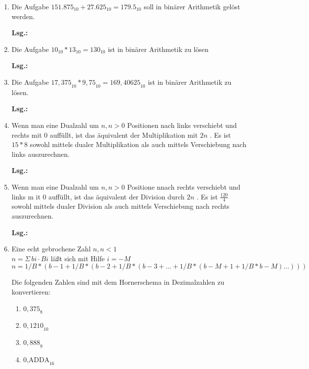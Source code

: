 \documentclass[12pt,a4paper]{scrreprt}
\newcommand{\Lsg}{\par \textbf{Lsg.: \hfill }}
\begin{document}
\begin{enumerate}
\Lsg%

\item Die Aufgabe ${151.875}_{10} + {27.625}_{10} = {179.5}_{10}$ soll in binärer Arithmetik gelöst werden.

\Lsg%

\item Die Aufgabe ${10}_{10}*{13}_{10}={130}_{10}$ ist in binärer Arithmetik zu lösen

\Lsg%

\item Die Aufgabe ${17,375}_{10}*{9,75}_{10} = {169,40625}_{10}$ ist in binärer Arithmetik zu lösen.

\Lsg%

\item Wenn man eine Dualzahl um $n, n>0$ Positionen nach links verschiebt und rechts mit $0$ auffüllt, ist das äquivalent der Multiplikation mit $2 n$ . Es ist ${15}*{8}$ sowohl mittels dualer Multiplikation als auch mittels Verschiebung nach links auszurechnen.

\Lsg%

\item Wenn man eine Dualzahl um $n, n>0$ Positione nnach rechts verschiebt und links m it $0$ auffüllt, ist das äquivalent der Division durch $2n$ . Es ist $\frac{120}{4}$ sowohl mittels dualer Division als auch mittels Verschiebung nach rechts auszurechnen.

\Lsg%

\item Eine echt gebrochene Zahl $n, n<1$ \\
\begin{math}
n =
\Sigma\,bi \cdot B
i
\end{math}
läßt sich mit Hilfe
$i = -M$
\begin{math}
n = 1/B*(b -1 + 1 / B * ( b -2 + 1/B*(b -3 + ... + 1/B*(b -M +1 + 1 / B * b -M ) \ldots)))
\end{math}

Die folgenden Zahlen sind mit dem Hornerschema in Dezimalzahlen zu konvertieren:

\begin{enumerate}
	\item ${0,375}_{8}$
	\item ${0,1210}_{10}$
	\item ${0,888}_{9}$
	\item $\text{0,ADDA}_{16}$
\end{enumerate}


\end{enumerate}
\end{document}
